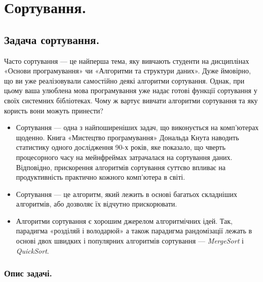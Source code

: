 \documentclass[12pt,a4paper]{report}
\begin{document}
\chapter{Сортування.}



\section{Задача сортування.}

Часто сортування --- це найперша тема, яку вивчають студенти на дисциплінах «Основи програмування» чи «Алгоритми та структури даних».
Дуже ймовірно, що ви уже реалізовували самостійно деякі алгоритми сортування.
Однак, при цьому ваша улюблена мова програмування уже надає готові функції сортування у своїх системних бібліотеках.
Чому ж вартує вивчати алгоритми сортування та яку користь вони можуть принести?

\begin{itemize}
    \item Сортування --- одна з найпоширеніших задач, що виконується на комп’ютерах щоденно.
        Книга «Мистецтво програмування» Дональда Кнута наводить статистику одного дослідження 90-х років, яке показало, що чверть процесорного часу на мейнфреймах затрачалася на сортування даних.
        Відповідно, прискорення алгоритмів сортування суттєво впливає на продуктивність практично кожного комп’ютера в світі.
    \item Сортування --- це алгоритм, який лежить в основі багатьох складніших алгоритмів, або дозволяє їх відчутно прискорювати.
    \item Алгоритми сортування є хорошим джерелом алгоритмічних ідей.
        Так, парадигма «розділяй і володарюй» а також парадигма рандомізації лежать в основі двох швидких і популярних алгоритмів сортування --- \emph{MergeSort} і \emph{QuickSort}.
\end{itemize}


\subsection{Опис задачі.}
\end{document}
